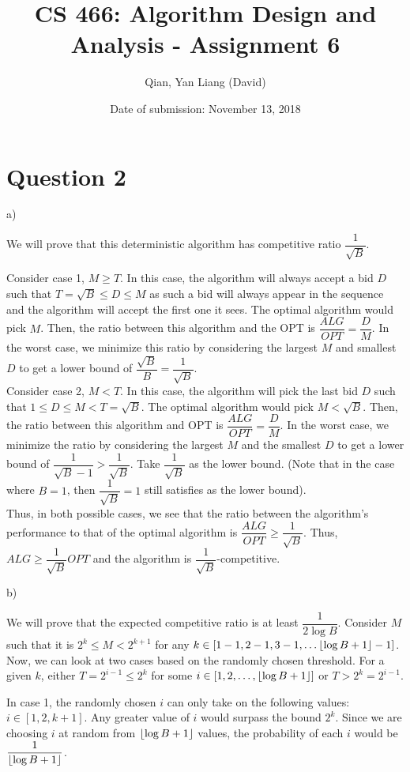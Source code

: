 \documentclass{article}
\title{CS 466: Algorithm Design and Analysis - Assignment 6}
\author{Qian, Yan Liang (David)}
\date{Date of submission: November 13, 2018}
\DeclarePairedDelimiter\floor{\lfloor}{\rfloor}
\begin{document}
\newpage

\section{Question 2}

a)

We will prove that this deterministic algorithm has competitive ratio $\dfrac{1}{\sqrt{B}}$.

Consider case 1, $M \geq T$.  In this case, the algorithm will always accept a bid $D$ such that $T = \sqrt{B} \leq D
\leq M$ as such a bid will always appear in the sequence and the algorithm will accept the first one it sees. The
optimal algorithm would pick $M$. Then, the ratio between this algorithm and the OPT is $\dfrac{ALG}{OPT} =
\dfrac{D}{M}$. In the worst case, we minimize this ratio by considering the largest $M$ and smallest $D$ to get a lower
bound of $\dfrac{\sqrt{B}}{B} = \dfrac{1}{\sqrt{B}}$. \\

Consider case 2, $M < T$. In this case, the algorithm will pick the last bid $D$ such that $1 \leq D \leq M < T = \sqrt{B}$.
The optimal algorithm would pick $M < \sqrt{B}$. Then, the ratio between this algorithm and OPT is $\dfrac{ALG}{OPT} =
\dfrac{D}{M}$. In the worst case, we minimize the ratio by considering the largest $M$ and the smallest $D$ to get a
lower bound of $\dfrac{1}{\sqrt{B} - 1} > \dfrac{1}{\sqrt{B}}$. Take $\dfrac{1}{\sqrt{B}}$ as the lower bound. (Note
that in the case where $B = 1$, then $\dfrac{1}{\sqrt{B}} = 1$ still satisfies as the lower bound). \\

Thus, in both possible cases, we see that the ratio between the algorithm's performance to that of the optimal algorithm
is $\dfrac{ALG}{OPT} \geq \dfrac{1}{\sqrt{B}}$. Thus, $ALG \geq \dfrac{1}{\sqrt{B}} OPT$ and the algorithm is
$\dfrac{1}{\sqrt{B}}$-competitive.



b)

We will prove that the expected competitive ratio is at least $\dfrac{1}{2 \log B}$. Consider $M$ such that it is $2^k
\leq M < 2^{k+1}$ for any $k \in [1 - 1, 2 - 1, 3 - 1, \ldots \floor{\log B + 1} - 1]$. Now, we can look at two cases
based on the randomly chosen threshold. For a given $k$, either $T = 2^{i-1} \leq 2^{k}$ for some $i \in [1, 2,
\ldots, \floor{\log B + 1}]$ or $T > 2^{k} = 2^{i - 1}$.

In case 1, the randomly chosen $i$ can only take on the following values: $i \in [1, 2, k + 1]$. Any greater value of
$i$ would surpass the bound $2^k$. Since we are choosing $i$ at random from $\floor{\log B + 1}$ values, the probability
of each $i$ would be $\dfrac{1}{\floor{\log B + 1}}$.
\end{document}
